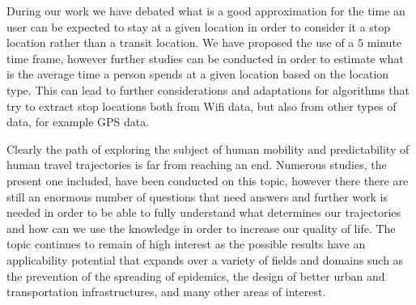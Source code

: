 During our work we have debated what is a good approximation for the time an
user can be expected to stay at a given location in order to consider it a stop
location rather than a transit location. We have proposed the use of a $5$
minute time frame, however further studies can be conducted in order to estimate
what is the average time a person spends at a given location based on the
location type. This can lead to further considerations and adaptations for
algorithms that try to extract stop locations both from Wifi data, but also from
other types of data, for example GPS data.

Clearly the path of exploring the subject of human mobility and predictability
of human travel trajectories is far from reaching an end. Numerous studies, the
present one included, have been conducted on this topic, however there there are
still an enormous number of questions that need answers and further work is
needed in order to be able to fully understand what determines our trajectories
and how can we use the knowledge in order to increase our quality of life. The
topic continues to remain of high interest as the possible results have an
applicability potential that expands over a variety of fields and domains such
as the prevention of the spreading of epidemics, the design of better urban and
transportation infrastructures, and many other areas of interest. 

